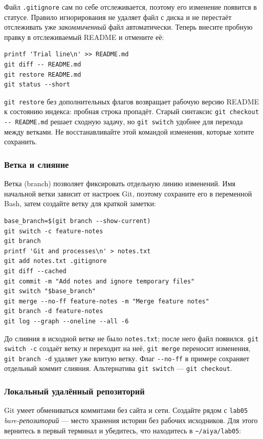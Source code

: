 Файл \texttt{.gitignore} сам по себе отслеживается, поэтому его изменение
появится в статусе. Правило игнорирования не удаляет файл с диска и не
перестаёт отслеживать уже \emph{закоммиченный} файл автоматически.
Теперь внесите пробную правку в отслеживаемый README и отмените её:

\begin{verbatim}
printf 'Trial line\n' >> README.md
git diff -- README.md
git restore README.md
git status --short
\end{verbatim}

\texttt{git restore} без дополнительных флагов возвращает рабочую версию
README к состоянию индекса: пробная строка пропадёт. Старый синтаксис
\texttt{git checkout -{}- README.md} решает сходную задачу, но
\texttt{git switch} удобнее для перехода между ветками. Не восстанавливайте
этой командой изменения, которые хотите сохранить.

\subsubsection*{Ветка и слияние}

Ветка (branch) позволяет фиксировать отдельную линию изменений. Имя
начальной ветки зависит от настроек Git, поэтому сохраните его в
переменной Bash, затем создайте ветку для краткой заметки:

\begin{verbatim}
base_branch=$(git branch --show-current)
git switch -c feature-notes
git branch
printf 'Git and processes\n' > notes.txt
git add notes.txt .gitignore
git diff --cached
git commit -m "Add notes and ignore temporary files"
git switch "$base_branch"
git merge --no-ff feature-notes -m "Merge feature notes"
git branch -d feature-notes
git log --graph --oneline --all -6
\end{verbatim}

До слияния в исходной ветке не было \texttt{notes.txt}; после него файл
появился. \texttt{git switch -c} создаёт ветку и переходит на неё,
\texttt{git merge} переносит изменения, \texttt{git branch -d} удаляет
уже влитую ветку. Флаг \texttt{-{}-no-ff} в примере сохраняет отдельный
коммит слияния. Альтернатива \texttt{git switch} --- \texttt{git checkout}.

\subsubsection*{Локальный удалённый репозиторий}

Git умеет обмениваться коммитами без сайта и сети. Создайте рядом с
\texttt{lab05} \emph{bare-репозиторий} --- место хранения истории без
рабочих исходников. Для этого вернитесь в первый терминал и убедитесь,
что находитесь в \texttt{\textasciitilde{}/aiya/lab05}:

